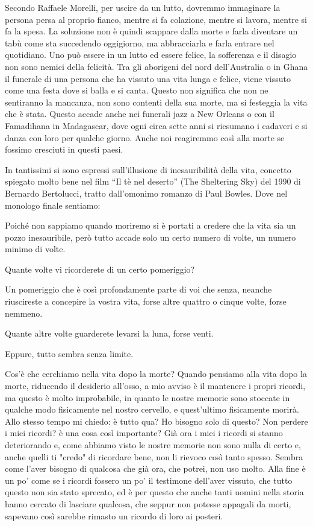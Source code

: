 \documentclass[12pt]{book} %
\begin{document}
Secondo Raffaele Morelli, per uscire da un lutto, dovremmo immaginare la persona persa al proprio fianco, mentre si fa
colazione, mentre si lavora, mentre si fa la spesa. La soluzione non è quindi scappare dalla morte e farla diventare un
tabù come sta succedendo oggigiorno, ma abbracciarla e farla entrare nel quotidiano. Uno può essere in un lutto ed
essere felice, la sofferenza e il disagio non sono nemici della felicità.
Tra gli aborigeni del nord dell'Australia o in Ghana il funerale di una persona che ha vissuto una vita lunga e felice, viene
vissuto come una festa dove si balla e si canta. Questo non significa che non ne sentiranno la mancanza, non sono
contenti della sua morte, ma si festeggia la vita che è stata. Questo accade anche nei funerali jazz a New Orleans o
con il Famadihana in Madagascar, dove ogni circa sette anni si riesumano i cadaveri e si danza con loro per qualche
giorno. Anche noi reagiremmo così alla morte se fossimo cresciuti in questi paesi.


\bigskip

In tantissimi si sono espressi sull'illusione di inesauribilità della vita, concetto spiegato molto
bene nel film “Il tè nel deserto” (The Sheltering Sky) del 1990 di Bernardo Bertolucci, tratto dall'omonimo romanzo di
Paul Bowles. Dove nel monologo finale sentiamo:

Poiché non sappiamo quando moriremo si è portati a credere che la vita sia un pozzo inesauribile, però tutto accade solo
un certo numero di volte, un numero minimo di volte.

Quante volte vi ricorderete di un certo pomeriggio?

Un pomeriggio che è così profondamente parte di voi che senza, neanche riuscireste a concepire la vostra vita, forse
altre quattro o cinque volte, forse nemmeno.

Quante altre volte guarderete levarsi la luna, forse venti.

Eppure, tutto sembra senza limite.

Cos'è che cerchiamo nella vita dopo la morte? Quando pensiamo alla vita dopo la morte, riducendo il desiderio all'osso, a mio avviso è il mantenere i propri ricordi, ma questo è molto improbabile, in quanto le nostre memorie sono stoccate in qualche modo fisicamente nel nostro cervello, e quest'ultimo fisicamente morirà. Allo stesso tempo mi chiedo: è tutto qua? Ho bisogno solo di questo? Non perdere i miei ricordi? è una cosa così importante? Già ora i miei i ricordi si stanno deteriorando e, come abbiamo visto le nostre memorie non sono nulla di certo e, anche quelli ti "credo" di ricordare bene, non li rievoco così tanto spesso. Sembra come l'aver bisogno di qualcosa che già  ora, che potrei, non uso molto. Alla fine è un po' come se i ricordi fossero un po' il testimone dell'aver vissuto, che tutto questo non sia stato sprecato, ed è per questo che anche tanti uomini nella storia hanno cercato di lasciare qualcosa, che seppur non potesse appagali da morti, sapevano così sarebbe rimasto un ricordo di loro ai posteri.
\end{document}
